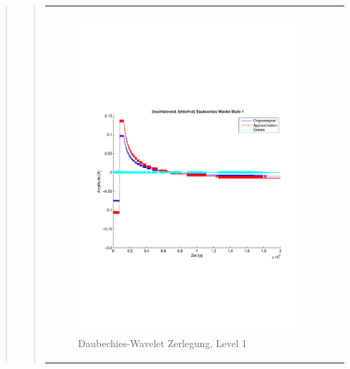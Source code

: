 \begin{quote}
\begin{quote}
\begin{center}
\begin{tabular}{ll}
\begin{minipage}{0.6\textwidth}
                        \begin{figure}[H]
                            \label{fig:}
                            \includegraphics[scale=0.4, trim = 2cm 6cm 1cm
                            7.5cm,
                            clip]{./Bilder/Termin8/fehlerfrei_hochlaufen_Daubechies_Wavlet_lvl_1}
                            \caption{Daubechies-Wavelet Zerlegung, Level 1}
                        \end{figure}
                    \vspace{-1.5em}
    
                    \end{minipage}
    
                \end{tabular}
                \end{center}
                

\end{quote}
\end{quote}
